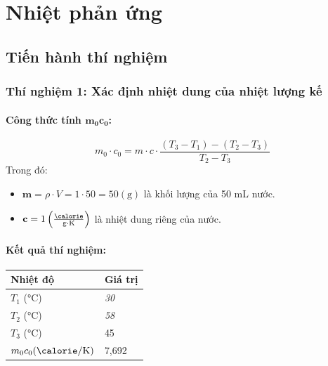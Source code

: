 \setcounter{chapter}{1}
\chapter{Nhiệt phản ứng}

\section{Tiến hành thí nghiệm}

\subsection{Thí nghiệm 1: Xác định nhiệt dung của nhiệt lượng kế}
    \subsubsection{Công thức tính \(\mathbf{m_0c_0}\):}
        \begin{equation}
            m_0 \cdot c_0=m\cdot c \cdot\frac{(T_3-T_1)-(T_2-T_3)}{T_2-T_3}
        \end{equation}
        Trong đó:
        \begin{itemize}
            \item \(\mathbf{m} = \rho \cdot V = 1 \cdot 50 = 50 (\si{\gram}) \) là khối lượng của 50 \si{\milli\liter} nước.
            \item \(\mathbf{c} = 1 \left(\frac{\si{\calorie}}{\si{\gram} \cdot \si{\kelvin}} \right) \) là nhiệt dung riêng của nước.
        \end{itemize}
    \subsubsection{Kết quả thí nghiệm:}
        \begin{center}
            \begin{tabular}{|C{0.25\textwidth}|C{0.6\textwidth}|}
                \hline
                Nhiệt độ & Giá trị \\ \hline
                \(T_1\) (\si{\celsius}) & \textit{30} \\ \hline
                \(T_2\) (\si{\celsius}) & \textit{58} \\ \hline
                \(T_3\) (\si{\celsius}) & 45 \\ \hline
                \(m_0c_0 (\si{\calorie} / \si{\kelvin})\) & 7,692 \\ \hline
            \end{tabular}
        \end{center}
